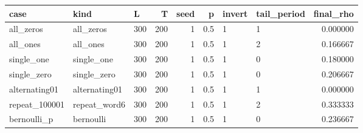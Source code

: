 \begin{tabular}{lllrrrllr}%
\hline%
\textbf{case}&\textbf{kind}&\textbf{L}&\textbf{T}&\textbf{seed}&\textbf{p}&\textbf{invert}&\textbf{tail\_period}&\textbf{final\_rho}\\%
\hline%
all\_zeros&all\_zeros&300&200&1&0.5&1&1&0.000000\\%
all\_ones&all\_ones&300&200&1&0.5&1&2&0.166667\\%
single\_one&single\_one&300&200&1&0.5&1&0&0.180000\\%
single\_zero&single\_zero&300&200&1&0.5&1&0&0.206667\\%
alternating01&alternating01&300&200&1&0.5&1&1&0.000000\\%
repeat\_100001&repeat\_word6&300&200&1&0.5&1&2&0.333333\\%
bernoulli\_p&bernoulli&300&200&1&0.5&1&0&0.236667\\%
\hline%
\end{tabular}
